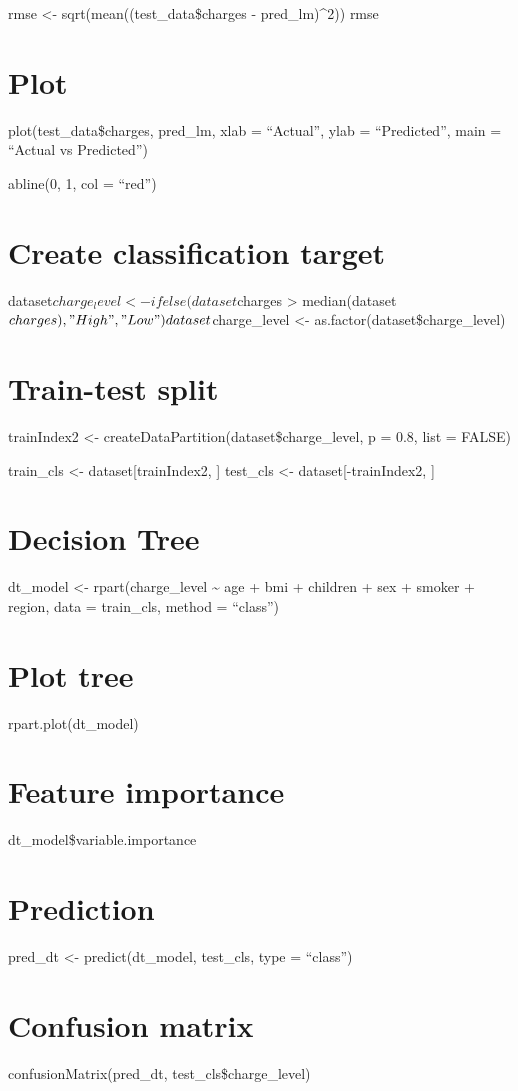 \documentclass[
]{article}
\begin{document}
rmse \textless- sqrt(mean((test\_data\$charges - pred\_lm)\^{}2)) rmse

\section{Plot}\label{plot}

plot(test\_data\$charges, pred\_lm, xlab = ``Actual'', ylab =
``Predicted'', main = ``Actual vs Predicted'')

abline(0, 1, col = ``red'')

\section{Create classification
target}\label{create-classification-target}

dataset\(charge_level <- ifelse(dataset\)charges \textgreater{}
median(dataset\(charges), "High", "Low")
dataset\)charge\_level \textless- as.factor(dataset\$charge\_level)

\section{Train-test split}\label{train-test-split-1}

trainIndex2 \textless- createDataPartition(dataset\$charge\_level, p =
0.8, list = FALSE)

train\_cls \textless- dataset{[}trainIndex2, {]} test\_cls \textless-
dataset{[}-trainIndex2, {]}

\section{Decision Tree}\label{decision-tree}

dt\_model \textless- rpart(charge\_level \textasciitilde{} age + bmi +
children + sex + smoker + region, data = train\_cls, method = ``class'')

\section{Plot tree}\label{plot-tree}

rpart.plot(dt\_model)

\section{Feature importance}\label{feature-importance}

dt\_model\$variable.importance

\section{Prediction}\label{prediction-1}

pred\_dt \textless- predict(dt\_model, test\_cls, type = ``class'')

\section{Confusion matrix}\label{confusion-matrix}

confusionMatrix(pred\_dt, test\_cls\$charge\_level)
\end{document}
